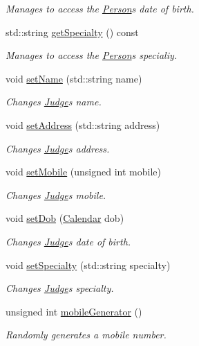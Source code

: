 \begin{DoxyCompactItemize}
\begin{DoxyCompactList}\small\item\em Manages to access the \hyperlink{class_person}{Person}\textquotesingle{}s date of birth. \end{DoxyCompactList}\item 
std\+::string \hyperlink{class_person_a9591e789fdcc361389a301d6da3a9376}{get\+Specialty} () const
\begin{DoxyCompactList}\small\item\em Manages to access the \hyperlink{class_person}{Person}\textquotesingle{}s specialiy. \end{DoxyCompactList}\item 
void \hyperlink{class_person_ad6e438f456d3ae6f5b477931c0a6aeba}{set\+Name} (std\+::string name)
\begin{DoxyCompactList}\small\item\em Changes \hyperlink{class_judge}{Judge}\textquotesingle{}s name. \end{DoxyCompactList}\item 
void \hyperlink{class_person_a647fc66d29687250cdba9259e7efe632}{set\+Address} (std\+::string address)
\begin{DoxyCompactList}\small\item\em Changes \hyperlink{class_judge}{Judge}\textquotesingle{}s address. \end{DoxyCompactList}\item 
void \hyperlink{class_person_afa108f8231d33585e5801320a18dbb08}{set\+Mobile} (unsigned int mobile)
\begin{DoxyCompactList}\small\item\em Changes \hyperlink{class_judge}{Judge}\textquotesingle{}s mobile. \end{DoxyCompactList}\item 
void \hyperlink{class_person_afd8a9d5081dc37de47bb97963b984b7e}{set\+Dob} (\hyperlink{class_calendar}{Calendar} dob)
\begin{DoxyCompactList}\small\item\em Changes \hyperlink{class_judge}{Judge}\textquotesingle{}s date of birth. \end{DoxyCompactList}\item 
void \hyperlink{class_person_a1813e3c432b72dbb4b5d7a2686c85c7e}{set\+Specialty} (std\+::string specialty)
\begin{DoxyCompactList}\small\item\em Changes \hyperlink{class_judge}{Judge}\textquotesingle{}s specialty. \end{DoxyCompactList}\item 
unsigned int \hyperlink{class_person_a84de3c2e51ab181bc231a0918faf8fa6}{mobile\+Generator} ()
\begin{DoxyCompactList}\small\item\em Randomly generates a mobile number. \end{DoxyCompactList}\end{DoxyCompactItemize}

